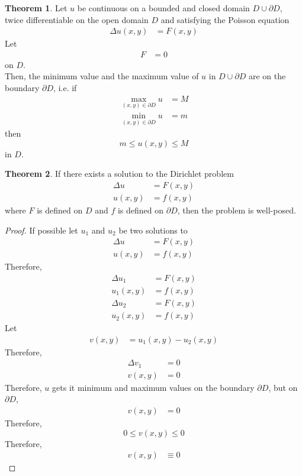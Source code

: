 \documentclass[titlepage, fleqn, a4paper, 12pt, twoside]{article}
\theoremstyle{definition}
\theoremstyle{theorem}
\newtheorem{theorem}{Theorem}
\begin{document}
\begin{theorem}
	Let $u$ be continuous on a bounded and closed domain $D \cup \partial D$, twice differentiable on the open domain $D$ and satisfying the Poisson equation
	\begin{align*}
		\Delta u(x,y) & = F(x,y)
	\end{align*}
	Let
	\begin{align*}
		F & = 0
	\end{align*}
	on $D$.\\
	Then, the minimum value and the maximum value of $u$ in $D \cup \partial D$ are on the boundary $\partial D$, i.e. if
	\begin{align*}
		\max\limits_{(x,y) \in \partial D} u & = M \\
		\min\limits_{(x,y) \in \partial D} u & = m
	\end{align*}
	then
	\begin{equation*}
		m \le u(x,y) \le M
	\end{equation*}
	in $D$.
\end{theorem}

\begin{theorem}
	If there exists a solution to the Dirichlet problem
	\begin{align*}
		\Delta u & = F(x,y) \\
		u(x,y)   & = f(x,y)
	\end{align*}
	where $F$ is defined on $D$ and $f$ is defined on $\partial D$, then the problem is well-posed.
\end{theorem}

\begin{proof}
	If possible let $u_1$ and $u_2$ be two solutions to
	\begin{align*}
		\Delta u & = F(x,y) \\
		u(x,y)   & = f(x,y)
	\end{align*}
	Therefore,
	\begin{align*}
		\Delta u_1 & = F(x,y) \\
		u_1(x,y)   & = f(x,y) \\
		\Delta u_2 & = F(x,y) \\
		u_2(x,y)   & = f(x,y)
	\end{align*}
	Let
	\begin{align*}
		v(x,y) & = u_1(x,y) - u_2(x,y)
	\end{align*}
	Therefore,
	\begin{align*}
		\Delta v_1 & = 0 \\
		v(x,y)     & = 0
	\end{align*}
	Therefore, $u$ gets it minimum and maximum values on the boundary $\partial D$, but on $\partial D$,
	\begin{align*}
		v(x,y) & = 0
	\end{align*}
	Therefore,
	\begin{equation*}
		0 \le v(x,y) \le 0
	\end{equation*}
	Therefore,
	\begin{align*}
		v(x,y) & \equiv 0
	\end{align*}
\end{proof}
\end{document}
